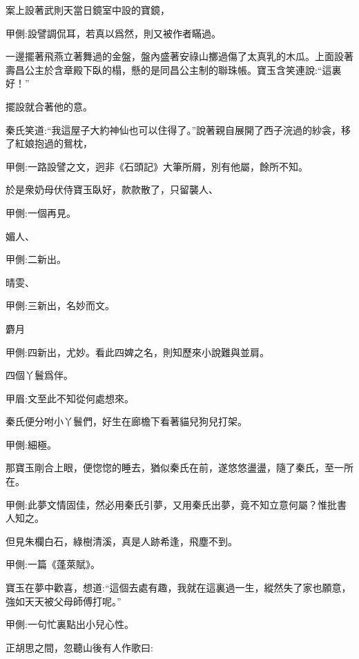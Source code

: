 \begin{parag}
    案上設著武則天當日鏡室中設的寶鏡，\begin{note}甲側:設譬調侃耳，若真以爲然，則又被作者瞞過。\end{note}一邊擺著飛燕立著舞過的金盤，盤內盛著安祿山擲過傷了太真乳的木瓜。上面設著壽昌公主於含章殿下臥的榻，懸的是同昌公主制的聯珠帳。寶玉含笑連說:“這裏好！”\begin{note}擺設就合著他的意。\end{note}秦氏笑道:“我這屋子大約神仙也可以住得了。”說著親自展開了西子浣過的紗衾，移了紅娘抱過的鴛枕，\begin{note}甲側:一路設譬之文，迥非《石頭記》大筆所屑，別有他屬，餘所不知。\end{note}於是衆奶母伏侍寶玉臥好，款款散了，只留襲人、\begin{note}甲側:一個再見。\end{note}媚人、\begin{note}甲側:二新出。\end{note}晴雯、\begin{note}甲側:三新出，名妙而文。\end{note}麝月\begin{note}甲側:四新出，尤妙。看此四婢之名，則知歷來小說難與並肩。\end{note}四個丫鬟爲伴。\begin{note}甲眉:文至此不知從何處想來。\end{note}秦氏便分咐小丫鬟們，好生在廊檐下看著貓兒狗兒打架。\begin{note}甲側:細極。\end{note}
\end{parag}


\begin{parag}
    那寶玉剛合上眼，便惚惚的睡去，猶似秦氏在前，遂悠悠盪盪，隨了秦氏，至一所在。\begin{note}甲側:此夢文情固佳，然必用秦氏引夢，又用秦氏出夢，竟不知立意何屬？惟批書人知之。\end{note}但見朱欄白石，綠樹清溪，真是人跡希逢，飛塵不到。\begin{note}甲側:一篇《蓬萊賦》。\end{note}寶玉在夢中歡喜，想道:“這個去處有趣，我就在這裏過一生，縱然失了家也願意，強如天天被父母師傅打呢。”\begin{note}甲側:一句忙裏點出小兒心性。\end{note}正胡思之間，忽聽山後有人作歌曰:
\end{parag}


